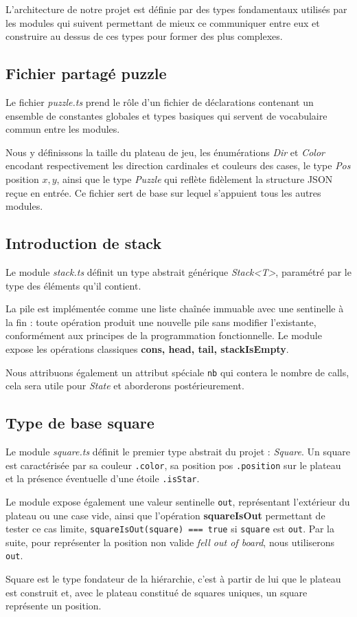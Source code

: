 L’architecture de notre projet est définie par des types fondamentaux utilisés par les modules qui suivent permettant de mieux ce communiquer entre eux et construire au dessus de ces types pour former des plus complexes.

\subsection{Fichier partagé puzzle}

Le fichier \textit{puzzle.ts} prend le rôle d’un fichier de déclarations contenant un ensemble de constantes globales et types basiques qui servent de vocabulaire commun entre les modules.

Nous y définissons la taille du plateau de jeu, les énumérations \textit{Dir} et \textit{Color} encodant respectivement les direction cardinales et couleurs des cases, le type \textit{Pos} position $x,y$, ainsi que le type \textit{Puzzle} qui reflète fidèlement la structure JSON reçue en entrée. Ce fichier sert de base sur lequel s'appuient tous les autres modules. 

\subsection{Introduction de stack}

Le module \textit{stack.ts} définit un type abstrait générique \textit{Stack<T>}, paramétré par le type des éléments qu'il contient. 

La pile est implémentée comme une liste chaînée immuable avec une sentinelle à la fin : toute opération produit une nouvelle pile sans modifier l'existante, conformément aux principes de la programmation fonctionnelle. Le module expose les opérations classiques \textbf{cons, head, tail, stackIsEmpty}.

Nous attribuons également un attribut spéciale \texttt{nb} qui contera le nombre de calls, cela sera utile pour \textit{State} et aborderons postérieurement.

\subsection{Type de base square}

Le module \textit{square.ts} définit le premier type abstrait du projet : \textit{Square}. Un square est caractérisée par sa couleur \texttt{.color}, sa position pos \texttt{.position} sur le plateau et la présence éventuelle d'une étoile \texttt{.isStar}. 

Le module expose également une valeur sentinelle \texttt{out}, représentant l'extérieur du plateau ou une case vide, ainsi que l'opération \textbf{squareIsOut} permettant de tester ce cas limite, \texttt{squareIsOut(square) === true} si \texttt{square} est \texttt{out}. Par la suite, pour représenter la position non valide \textit{fell out of board}, nous utiliserons \texttt{out}.

Square est le type fondateur de la hiérarchie, c'est à partir de lui que le plateau est construit et, avec le plateau constitué de squares uniques, un square représente un position.
